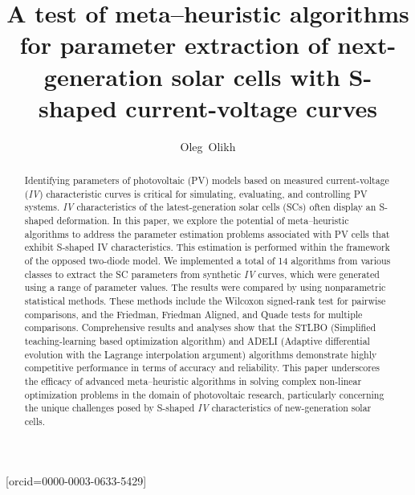 \documentclass[a4paper,fleqn]{cas-sc}
\begin{document}
\let\WriteBookmarks\relax
\def\floatpagepagefraction{1}
\def\textpagefraction{.001}




\title [mode = title]{A test of meta--heuristic algorithms for parameter extraction of next-generation solar cells with S-shaped current-voltage curves}

\author{Oleg~Olikh}[orcid=0000-0003-0633-5429]






\begin{abstract}
Identifying parameters of photovoltaic (PV) models based on measured current-voltage (\emph{IV}) characteristic curves is critical for simulating, evaluating, and controlling PV systems.
\emph{IV} characteristics of the latest-generation solar cells (SCs) often display an S-shaped deformation.
In this paper, we explore the potential of meta--heuristic algorithms to address the parameter estimation problems
associated with PV cells that exhibit S-shaped IV characteristics.
This estimation is performed within the framework of the opposed two-diode model.
We implemented a total of 14 algorithms from various classes to extract the SC parameters
from synthetic \emph{IV} curves, which were generated using a range of parameter values.
The results were compared by using nonparametric statistical methods.
These methods include the Wilcoxon signed-rank test for pairwise comparisons, and the Friedman, Friedman Aligned, and Quade tests for multiple comparisons.
Comprehensive results and analyses show that the STLBO (Simplified teaching-learning based optimization algorithm) and ADELI (Adaptive differential evolution with the Lagrange interpolation argument) algorithms demonstrate highly competitive performance in terms of accuracy and reliability.
This paper underscores the efficacy of advanced meta--heuristic algorithms in solving complex non-linear optimization problems in the domain of photovoltaic research, particularly concerning the unique challenges posed by S-shaped \emph{IV} characteristics of new-generation solar cells.
\end{abstract}
\end{document}

